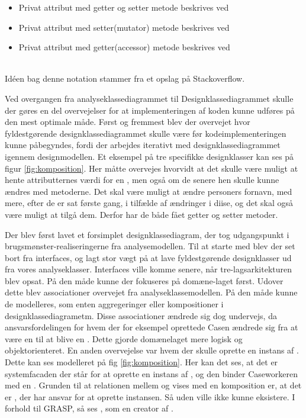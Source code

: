 \documentclass[../../main.tex]{subfiles}
\begin{document}
\begin{itemize}
\item Privat attribut med getter og setter metode beskrives ved  
\item Privat attribut med setter(mutator) metode beskrives ved 
\item Privat attribut med getter(accessor) metode beskrives ved 
\end{itemize}
\mbox{} \\
Idéen bag denne notation stammer fra et opslag på Stackoverflow.\cite{stack}

Ved overgangen fra analyseklassediagrammet til Designklassediagrammet skulle der gøres en del overvejelser for at implementeringen af koden kunne udføres på den mest optimale måde. Først og fremmest blev der overvejet hvor fyldestgørende designklassediagrammet skulle være før kodeimplementeringen kunne påbegyndes, fordi der arbejdes iterativt med designklassediagrammet igennem designmodellen. Et eksempel på tre specifikke designklasser kan ses på figur \ref{fig:komposition}. Her måtte overvejes hvorvidt at det skulle være muligt at hente attributternes værdi for en , men også om de senere hen skulle kunne ændres med  metoderne. Det skal være muligt at ændre personers fornavn, med mere, efter de er sat første gang, i tilfælde af ændringer i diise, og det skal også være muligt at tilgå dem. Derfor har de både fået getter og setter metoder.

Der blev først lavet et forsimplet designklassediagram, der tog udgangspunkt i brugsmønster-realiseringerne fra analysemodellen. Til at starte med blev der set bort fra interfaces, og lagt stor vægt på at lave fyldestgørende designklasser ud fra vores analyseklasser. Interfaces ville komme senere, når tre-lagsarkitekturen blev opsat. På den måde kunne der fokuseres på domæne-laget først. Udover dette blev associationer overvejet fra analyseklassemodellen. På den måde kunne de modelleres, som enten aggregeringer eller kompositioner i designklassediagrametm. Disse associationer ændrede sig dog undervejs, da ansvarsfordelingen for hvem der for eksempel oprettede Casen ændrede sig fra at være en  til at blive en . Dette gjorde domænelaget mere logisk og objektorienteret. En anden overvejelse var hvem der skulle oprette en instans af . Dette kan ses modelleret på fig \ref{fig:komposition}. Her kan det ses, at det er systemfacaden der står for at oprette en instans af , og den binder Caseworkeren med en . Grunden til at relationen mellem  og  vises med en komposition er, at det er , der har ansvar for at oprette instansen. Så uden  ville  ikke kunne eksistere. I forhold til GRASP, så ses , som en creator af .
\end{document}
